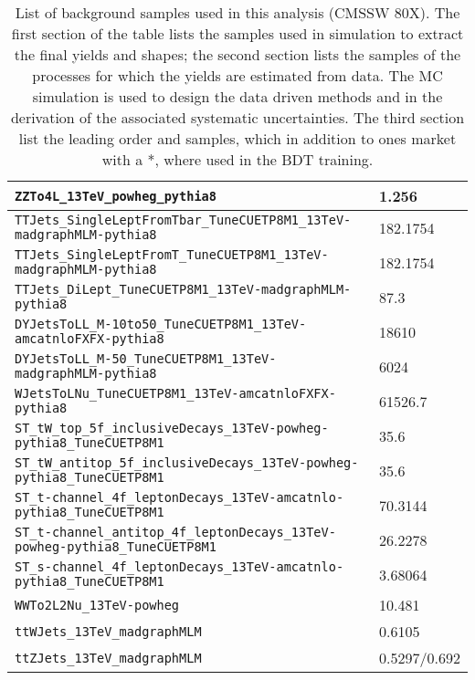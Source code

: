 \begin{table}
\begin{tabular}{ll}
    \verb|ZZTo4L_13TeV_powheg_pythia8|                                              & 1.256 \\ \hline
    \verb|TTJets_SingleLeptFromTbar_TuneCUETP8M1_13TeV-madgraphMLM-pythia8|         & 182.1754 \quad * \\
    \verb|TTJets_SingleLeptFromT_TuneCUETP8M1_13TeV-madgraphMLM-pythia8|            & 182.1754 \quad * \\
    \verb|TTJets_DiLept_TuneCUETP8M1_13TeV-madgraphMLM-pythia8|                     & 87.3 \quad\quad\quad * \\
    \verb|DYJetsToLL_M-10to50_TuneCUETP8M1_13TeV-amcatnloFXFX-pythia8|              & 18610 \\
    \verb|DYJetsToLL_M-50_TuneCUETP8M1_13TeV-madgraphMLM-pythia8|                   & 6024 \\
    \verb|WJetsToLNu_TuneCUETP8M1_13TeV-amcatnloFXFX-pythia8|                       & 61526.7 \\
    \verb|ST_tW_top_5f_inclusiveDecays_13TeV-powheg-pythia8_TuneCUETP8M1|           & 35.6 \\
    \verb|ST_tW_antitop_5f_inclusiveDecays_13TeV-powheg-pythia8_TuneCUETP8M1|       & 35.6 \\
    \verb|ST_t-channel_4f_leptonDecays_13TeV-amcatnlo-pythia8_TuneCUETP8M1|         & 70.3144\\
    \verb|ST_t-channel_antitop_4f_leptonDecays_13TeV-powheg-pythia8_TuneCUETP8M1|   & 26.2278\\
    \verb|ST_s-channel_4f_leptonDecays_13TeV-amcatnlo-pythia8_TuneCUETP8M1|         & 3.68064 \\
    \verb|WWTo2L2Nu_13TeV-powheg|                                                   & 10.481 \\\hline
    \verb|ttWJets_13TeV_madgraphMLM|                                                & 0.6105 \\
    \verb|ttZJets_13TeV_madgraphMLM|                                                & 0.5297/0.692 \\\hline
    
  \end{tabular}
  \caption[List of background samples used in this analysis (CMSSW 80X).]{List of background samples used in this analysis (CMSSW 80X). The first section of the table lists the samples used in simulation to extract the final yields and shapes; the second section lists the samples of the processes for which the yields are estimated from data. The MC simulation is used to design the data driven methods and in the derivation of the associated systematic uncertainties. The third section list the leading order \ttW and \ttZ samples, which in addition to ones market with a *, where used in the BDT training.} \label{tab:bgsamples}
\end{table}
